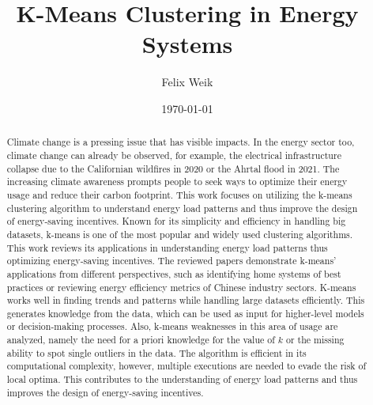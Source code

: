 \documentclass{revtex4-2}
\begin{document}
\title{K-Means Clustering in Energy Systems}
\author{Felix Weik}
\date{\today}


\begin{abstract}
Climate change is a pressing issue that has visible impacts.
In the energy sector too, climate change can already be observed, for example, the electrical infrastructure collapse due to the Californian wildfires in 2020 or the Ahrtal flood in 2021.
The increasing climate awareness prompts people to seek ways to optimize their energy usage and reduce their carbon footprint.
This work focuses on utilizing the k-means clustering algorithm to understand energy load patterns and thus improve the design of energy-saving incentives.
Known for its simplicity and efficiency in handling big datasets, k-means is one of the most popular and widely used clustering algorithms.
This work reviews its applications in understanding energy load patterns thus optimizing energy-saving incentives.
The reviewed papers demonstrate k-means' applications from different perspectives, such as identifying home systems of best practices or reviewing energy efficiency metrics of Chinese industry sectors.
K-means works well in finding trends and patterns while handling large datasets efficiently.
This generates knowledge from the data, which can be used as input for higher-level models or decision-making processes.
Also, k-means weaknesses in this area of usage are analyzed, namely the need for a priori knowledge for the value of $k$ or the missing ability to spot single outliers in the data.
The algorithm is efficient in its computational complexity, however, multiple executions are needed to evade the risk of local optima.
This contributes to the understanding of energy load patterns and thus improves the design of energy-saving incentives.
\end{abstract}

\maketitle












\clearpage

\end{document}
